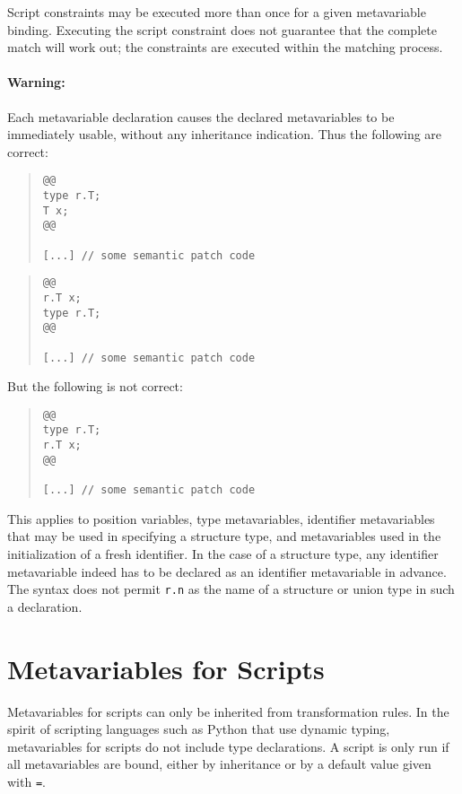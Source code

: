 Script constraints may be executed more than once for a given metavariable
binding.  Executing the script constraint does not guarantee that the
complete match will work out; the constraints are executed within the
matching process.

\paragraph*{Warning:} Each metavariable declaration causes the declared
metavariables to be immediately usable, without any inheritance
indication.  Thus the following are correct:

\begin{quote}
\begin{verbatim}
@@
type r.T;
T x;
@@

[...] // some semantic patch code
\end{verbatim}
\end{quote}

\begin{quote}
\begin{verbatim}
@@
r.T x;
type r.T;
@@

[...] // some semantic patch code
\end{verbatim}
\end{quote}

\noindent
But the following is not correct:

\begin{quote}
\begin{verbatim}
@@
type r.T;
r.T x;
@@

[...] // some semantic patch code
\end{verbatim}
\end{quote}

This applies to position variables, type metavariables, identifier
metavariables that may be used in specifying a structure type, and
metavariables used in the initialization of a fresh identifier.  In the
case of a structure type, any identifier metavariable indeed has to be
declared as an identifier metavariable in advance.  The syntax does not
permit {\tt r.n} as the name of a structure or union type in such a
declaration.

\section{Metavariables for Scripts}

Metavariables for scripts can only be inherited from transformation rules.
In the spirit of scripting languages such as Python that use dynamic
typing, metavariables for scripts do not include type declarations.
A script is only run if all metavariables are bound, either by inheritance
or by a default value given with {\tt =}.

